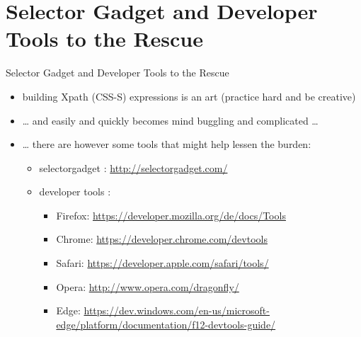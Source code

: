 \documentclass[ignorenonframetext,]{beamer}
\providecommand{\tightlist}{%
  \setlength{\itemsep}{0pt}\setlength{\parskip}{0pt}}
\begin{document}
\section{Selector Gadget and Developer Tools to the
Rescue}\label{selector-gadget-and-developer-tools-to-the-rescue}

\begin{frame}{Selector Gadget and Developer Tools to the Rescue}

\begin{itemize}
\tightlist
\item
  building Xpath (CSS-S) expressions is an art (practice hard and be
  creative)
\item
  \ldots{} and easily and quickly becomes mind buggling and complicated
  \ldots{}
\item
  \ldots{} there are however some tools that might help lessen the
  burden:

  \begin{itemize}
  \tightlist
  \item
    selectorgadget : \url{http://selectorgadget.com/}
  \item
    developer tools :

    \begin{itemize}
    \tightlist
    \item
      Firefox: \url{https://developer.mozilla.org/de/docs/Tools}
    \item
      Chrome: \url{https://developer.chrome.com/devtools}
    \item
      Safari: \url{https://developer.apple.com/safari/tools/}
    \item
      Opera: \url{http://www.opera.com/dragonfly/}
    \item
      Edge:
      \url{https://dev.windows.com/en-us/microsoft-edge/platform/documentation/f12-devtools-guide/}
    \end{itemize}
  \end{itemize}
\end{itemize}

\end{frame}
\end{document}
